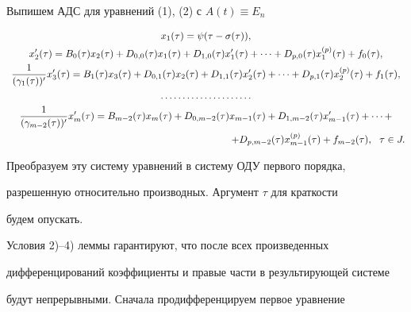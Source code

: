 \begin{pf}


Выпишем АДС для уравнений (1), (2) с $A(t) \equiv E_n$


\begin{gather}


x_1(\tau)= \psi(\tau - \sigma (\tau)),\notag \\


%


x'_2(\tau)=B_0(\tau)x_2(\tau)+D_{0,0}(\tau)x_1(\tau)+


D_{1,0}(\tau)x'_1(\tau)+ \dotsb + D_{p,0}(\tau)x^{(p)}_1(\tau)+f_0


(\tau),\notag \\


%


\frac{1}{(\gamma_1(\tau))'}x'_3(\tau)=B_1(\tau)x_3(\tau)+


D_{0,1}(\tau)x_2(\tau)+


D_{1,1}(\tau)x'_2(\tau)+ \dotsb +D_{p,1}(\tau)x^{(p)}_2(\tau)+f_1(\tau), \\


%


\dotsc\dotsc\dotsc\dotsc\dotsc\dotsc\dotsc \notag \\


%


\frac{1}{(\gamma_{m-2}(\tau))'}x'_m(\tau)=B_{m-2}(\tau)x_m(\tau)+


D_{0,m-2}(\tau)x_{m-1}(\tau)+


D_{1,m-2}(\tau)x'_{m-1}(\tau)+ \dotsb + \notag \\


%


\hspace{80mm}


+D_{p,m-2}(\tau)x^{(p)}_{m-1}(\tau)+f_{m-2}(\tau), \ \ \tau\in J.\notag


\end{gather}





Преобразуем эту систему уравнений в систему ОДУ первого порядка,


разрешенную относительно производных. Аргумент $\tau$ для краткости


будем опускать.


Условия 2)--4) леммы гарантируют, что после всех произведенных


дифференцирований коэффициенты и правые части в результирующей системе


будут непрерывными. Сначала продифференцируем первое уравнение



\end{pf}
